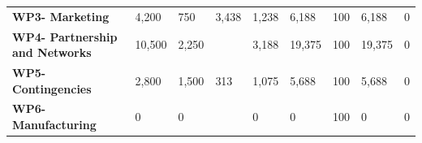 \begin{table}[H]
{\begin{tabular}{p{5cm}p{2cm}p{2cm}p{2.5cm}p{2cm}p{2cm}p{2cm}p{2cm}p{2cm}}
\textbf{WP3- Marketing}                                                            & 4,200                                                                           & 750                                                                         & 3,438                                                                                    & 1,238                                                                   & 6,188                                                                                   & 100                                                                                & 6,188                             & 0                                                                                  \\
\textbf{WP4- Partnership and Networks} & 10,500                                                                          & 2,250                                                                       &                                                                                          & 3,188                                                                   & 19,375                                                                                  & 100                                                                                & 19,375                            & 0                                                                                  \\
\textbf{WP5- Contingencies}                                                        & 2,800                                                                           & 1,500                                                                       & 313                                                                                      & 1,075                                                                   & 5,688                                                                                   & 100                                                                                & 5,688                             & 0                                                                                  \\
\textbf{WP6- Manufacturing}                                                        & 0                                                                               & 0                                                                           &                                                                                          & 0                                                                       & 0                                                                                       & 100                                                                                & 0                                 & 0                                                                                  \\ \hline

\end{tabular}}
\end{table}
